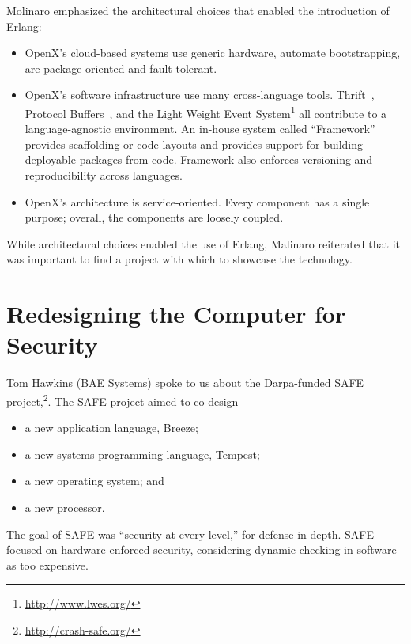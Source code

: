 \documentclass{jfp1}
\begin{document}
Molinaro emphasized the architectural choices that enabled the
introduction of Erlang:

\begin{itemize}

\item OpenX's cloud-based systems use generic hardware, automate
bootstrapping, are package-oriented and fault-tolerant.

\item OpenX's software infrastructure use many cross-language
tools. Thrift~\cite{Slee:Thrift}, Protocol
Buffers~\cite{Google:2014:Protobufs}, and the Light Weight Event System\footnote{\url{http://www.lwes.org/}} all contribute to a
language-agnostic environment. An in-house system called ``Framework''
provides scaffolding or code layouts and provides support for building
deployable packages from code. Framework also enforces versioning and
reproducibility across languages.

\item OpenX's architecture is service-oriented. Every component has a
single purpose; overall, the components are loosely coupled.

\end{itemize}
While architectural choices enabled the use of Erlang, Malinaro reiterated
that it was important to find a project with which to showcase the
technology.

\section{Redesigning the Computer for Security}


Tom Hawkins (BAE Systems) spoke to us about the Darpa-funded SAFE
project,\footnote{\url{http://crash-safe.org/}}. The SAFE project aimed to
co-design 
\begin{itemize}
\item a new application language, Breeze;
\item a new systems programming language, Tempest;
\item a new operating system; and
\item a new processor.
\end{itemize}
The goal of SAFE was ``security at every level,'' for defense in depth.
SAFE focused on hardware-enforced security, considering dynamic checking
in software as too expensive. 
\end{document}
